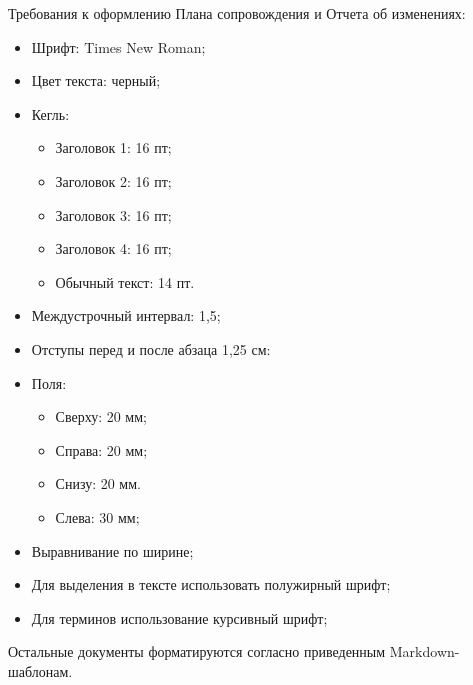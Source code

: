 Требования к оформлению Плана сопровождения и Отчета об изменениях:
\begin{itemize}
    \item Шрифт: Times New Roman;
    \item Цвет текста: черный;
    \item Кегль:
    \begin{itemize}
        \item Заголовок 1: 16 пт;
        \item Заголовок 2: 16 пт;
        \item Заголовок 3: 16 пт;
        \item Заголовок 4: 16 пт;
        \item Обычный текст: 14 пт.
    \end{itemize}
    \item Междустрочный интервал: 1,5;
    \item Отступы перед и после абзаца 1,25 см:
    \item Поля:
    \begin{itemize}
        \item Сверху: 20 мм;
        \item Справа: 20 мм;
        \item Снизу: 20 мм.
        \item Слева: 30 мм;
    \end{itemize}
    \item Выравнивание по ширине;
    \item Для выделения в тексте использовать полужирный шрифт;
    \item Для терминов использование курсивный шрифт;
\end{itemize}

Остальные документы форматируются согласно приведенным Markdown-шаблонам.

